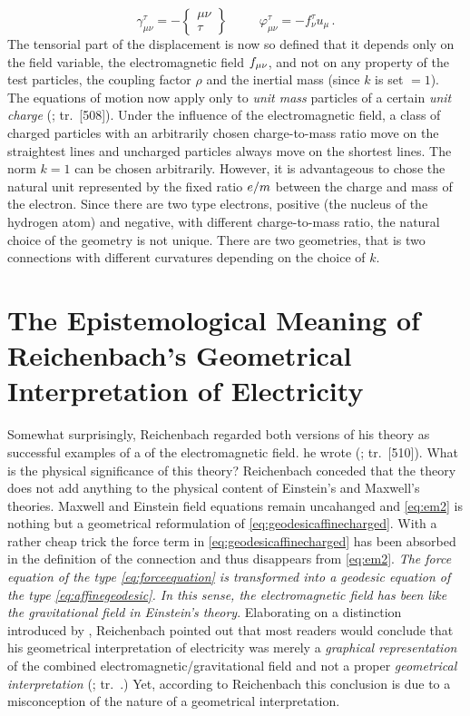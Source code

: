\documentclass[submitted]{article}
\newcommand{\faradaymn}{\ensuremath{f\mn}}
\newcommand{\ctmr}{charge-to-mass ratio\xspace}
\newcommand{\ctmrf}{\ensuremath{\hfrac{e}{m}}\xspace}
\renewcommand{\rzlp}[2]{(\cite[#1]{Reichenbach1928}; tr.\ #2)\xspace}
\renewcommand{\rzlap}[2]{(\cite[#1]{Reichenbach1928}; tr.\ [#2])\xspace}
\begin{document}
\begin{equation}
\label{eq:dsd2}
\gamma^\tau_{\mu\nu}=-\begin{Bmatrix} \mu\nu \\ \tau \end{Bmatrix} \;\;\;\;\;\;\;\;\; \varphi_{\mu \nu}^{\tau}=- f_\nu^{\tau} u_{\mu}\,.
\end{equation}
%
The tensorial part of the displacement is now so defined that it depends only on the field variable, the electromagnetic field \faradaymn, and not on any property of the test particles, \ie the coupling factor $\rho$ and the inertial mass (since $k$ is set $=1$). The equations of motion now apply only to \emph{unit mass} particles of a certain \emph{unit charge} \rzlap{363\f}{508\ff}. Under the influence of the electromagnetic field, a class of charged particles with an arbitrarily chosen \ctmr move on the straightest lines and uncharged particles always move on the shortest lines. The norm $k=1$ can be chosen arbitrarily. However, it is advantageous to chose the natural unit represented by the fixed ratio \ctmrf between the charge and mass of the electron. Since there are two type electrons, positive (the nucleus of the hydrogen atom) and negative, with different \ctmr, the natural choice of the geometry is not unique. There are two  geometries, that is two connections \Gtmn with different curvatures depending on the choice of $k$.
 
\section{The Epistemological Meaning of Reichenbach's Geometrical Interpretation of Electricity}
%
Somewhat surprisingly, Reichenbach regarded both versions of his theory as successful examples of a  of the electromagnetic field.  he wrote  \rzlap{365}{510}. What is the physical significance of this theory? Reichenbach conceded that the theory does not add anything to the physical content of Einstein's and Maxwell's theories. Maxwell and Einstein field equations remain uncahanged and \cref{eq:em2} is nothing but a geometrical reformulation of \cref{eq:geodesicaffinecharged}. With a rather cheap trick the force term in \cref{eq:geodesicaffinecharged} has been absorbed in the definition of the connection and thus disappears from \cref{eq:em2}. \emph{The force equation of the type \cref{eq:forceequation} is transformed into a geodesic equation of the type \cref{eq:affinegeodesic}. In this sense, the electromagnetic field has been  like the gravitational field in Einstein's theory}. Elaborating on a distinction introduced by \citet{Eddington1925a}, Reichenbach pointed out that most readers would conclude that his geometrical interpretation of electricity was merely a \emph{graphical representation} of the combined electromagnetic/gravitational field and not a proper \emph{geometrical interpretation} \rzlp{\S15}. Yet, according to Reichenbach this conclusion is due to a misconception of the nature of a geometrical interpretation. 
\end{document}
